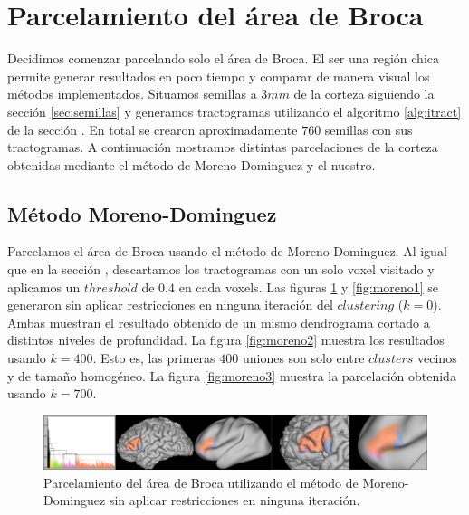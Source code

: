 \section{Parcelamiento del \'area de Broca}
\label{sec:parcela_broca}

Decidimos comenzar parcelando solo el \'area de Broca. El ser una regi\'on
chica permite generar resultados en poco tiempo y comparar de manera
visual los m\'etodos implementados. Situamos semillas a $3mm$ de la
corteza siguiendo la secci\'on \ref{sec:semillas} y generamos tractogramas
utilizando el algoritmo \ref{alg:itract} de la secci\'on 
\label{sec:convergencia}. En total se crearon aproximadamente $760$
semillas con sus tractogramas. A continuaci\'on mostramos distintas
parcelaciones de la corteza obtenidas mediante el m\'etodo de 
Moreno-Dominguez y el nuestro. \\

\subsection{M\'etodo Moreno-Dominguez}
\label{sec:moreno_broca}

Parcelamos el \'area de Broca usando el m\'etodo de Moreno-Dominguez. Al
igual que en la secci\'on \label{sec:clustering_moreno}, descartamos los
tractogramas con un solo voxel visitado y aplicamos un $threshold$ de $0.4$
en cada voxels. Las figuras \ref{fig:moreno0} y \ref{fig:moreno1} se 
generaron sin aplicar restricciones en ninguna iteraci\'on del $clustering$
($k=0$). Ambas muestran el resultado obtenido de un mismo dendrograma
cortado a distintos niveles de profundidad. La figura \ref{fig:moreno2}
muestra los resultados usando $k=400$. Esto es, las primeras $400$
uniones son solo entre $clusters$ vecinos y de tama\~no homog\'eneo. La
figura \ref{fig:moreno3} muestra la parcelaci\'on obtenida usando $k=700$.
\\

\begin{figure}[h!]
    \includegraphics[width=\textwidth]{img/broca/moreno_0.png}
    \caption{Parcelamiento del \'area de Broca utilizando el m\'etodo de 
             Moreno-Dominguez sin aplicar restricciones en ninguna
             iteraci\'on.}
    \label{fig:moreno0}
\end{figure}
                                                                                                                       
